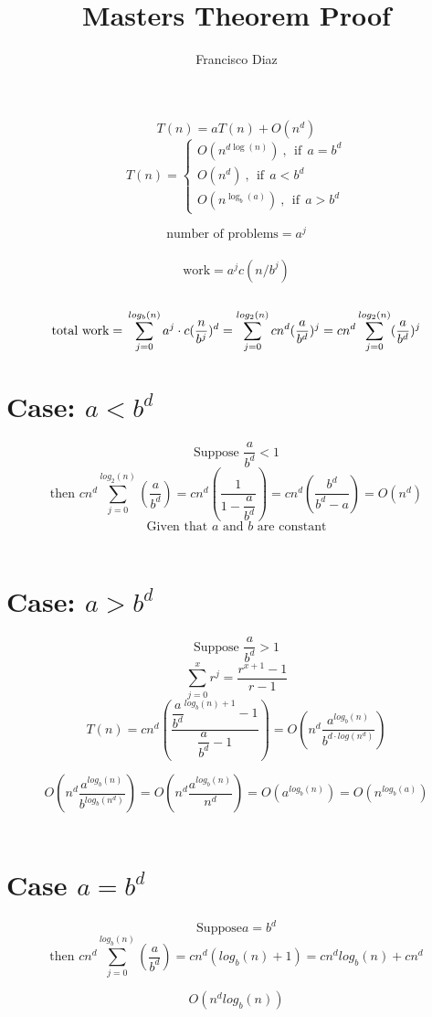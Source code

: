 \documentclass{report}
\title{Masters Theorem Proof}
\author{Francisco Diaz}
\begin{document}
\maketitle{}

$$T(n) = aT(n) + O(n^d)$$
\[T(n) = \begin{cases}
    O(n^{d\log(n)}) \ , \ \  \text{if} \ \ a = b^d \\
    O(n^d) \ ,  \ \ \text{if} \ \ a < b^d\\
    O(n^{\log_b(a)}) \ ,  \ \ \text{if} \ \ a > b^d 
\end{cases}\]

$$\text{number of problems} = a^j$$ \
$$ \text{work} = a^j c(n/b^j)$$ \
$$ \text{total work} = \\  \sum_{j=0}^{log_b(n)}a^j \cdot c(\dfrac{n}{b^j})^d= \sum_{j=0}^{log_2(n)}cn^d(\dfrac{a}{b^d})^j = cn^d\sum_{j=0}^{log_2(n)} (\dfrac{a}{b^d})^j $$
\section{Case: $a < b^d$}
$$\text{Suppose } \dfrac{a}{b^d} < 1$$
$$ \text{then } cn^d\sum_{j=0}^{log_2(n)}\left(\dfrac{a}{b^d}\right) = cn^d \left(\dfrac{1}{1 - \dfrac{a}{b^d}}\right) = cn^d \left(\dfrac{b^d}{b^d - a}\right) = O(n^d)$$
$$\text{Given that } a \text{ and } b \text{ are constant}$$ \\




\section{Case: $a>b^d$}
$$\text{Suppose }\dfrac{a}{b^d} > 1$$
$$ \sum_{j=0}^{x} r^j  = \dfrac{r^{x+1}-1}{r-1}$$
$$T(n) = cn^d\left(\dfrac{\dfrac{a}{b^d}^{log_b(n)+1}-1}{\dfrac{a}{b^d}-1}\right)=O\left( n^d \dfrac{a^{log_b(n)}}{b^{d \cdot log(n^d)}}\right)$$

$$O\left(n^d \dfrac{a^{log_b(n)}}{b^{log_b(n^d)}}\right)=O\left(n^d \dfrac{a^{log_b(n)}}{n^d}\right)= O\left(a^{log_b(n)}\right) = O\left(n^{log_b(a)}\right)$$  \\





\section{Case $a=b^d$}
$$ \text{Suppose} a = b^d$$
$$\text{then } cn^d\sum_{j=0}^{log_b(n)}\left(\dfrac{a}{b^d}\right) = cn^d\left(log_b(n) + 1\right) = cn^d log_b(n) + cn^d$$

$$ O\left(n^d log_b(n)\right)$$
\end{document}
